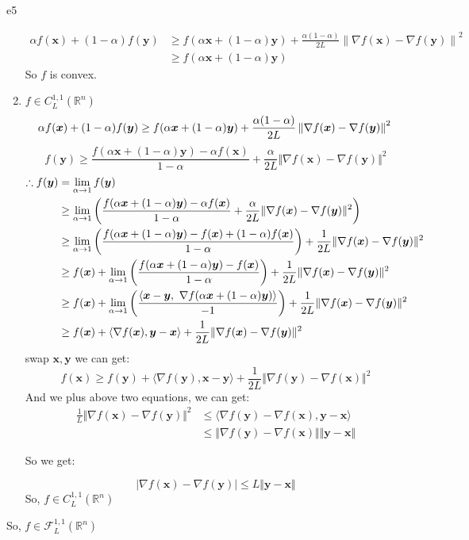 \documentclass{article}
\newcommand{\xB}{\bm{x}}
\newcommand{\yB}{\bm{y}}
\newcommand{\RBB}{\mathbb{R}}
\newcommand{\normgen}[1]{\left\| #1 \right\|}
\begin{document}
\begin{PROOF}{e5}
\begin{enumerate}
			\begin{align*} 
				\alpha f(\xB) + (1-\alpha) f(\yB) &\geq f( \alpha \xB + (1-\alpha) \yB) \nonumber + \frac{\alpha(1-\alpha)}{2L} \normgen{\nabla f(\xB) - \nabla f(\yB)}^2\\
				&\geq f( \alpha \xB + (1-\alpha) \yB) 
			\end{align*}
			So $f$ is convex.
		\item $f \in C_{L}^{1,1}(\RBB^n)$
			\begin{equation}
				\alpha f(\xB) + (1-\alpha) f(\yB) \geq f( \alpha \xB + (1-\alpha) \yB) \nonumber+ \frac{\alpha(1-\alpha)}{2L} \normgen{\nabla f(\xB) - \nabla f(\yB)}^2\\
			\end{equation}
			\begin{equation}
				f(\yB)\ge \frac{f(\alpha \xB + (1-\alpha) \yB)-\alpha f(\xB)}{1-\alpha}+\frac{\alpha}{2L} \Vert \nabla f(\xB) - \nabla f(\yB)\Vert ^2
			\end{equation}
			\begin{align}
				\therefore f(\yB) &= \lim_{\alpha\rightarrow 1}f(\yB)\\
				&\ge \lim_{\alpha\rightarrow 1} \left(\frac{f(\alpha \xB + (1-\alpha) \yB)-\alpha f(\xB)}{1-\alpha}+\frac{\alpha}{2L} \Vert \nabla f(\xB) - \nabla f(\yB)\Vert ^2\right)\\
				&\ge \lim_{\alpha\rightarrow 1} \left(\frac{f(\alpha \xB + (1-\alpha) \yB)-f(\xB) + (1-\alpha) f(\xB)}{1-\alpha}\right)+\frac{1}{2L} \Vert \nabla f(\xB) - \nabla f(\yB)\Vert ^2\\
				&\ge f(\xB)+\lim_{\alpha\rightarrow 1} \left(\frac{f(\alpha \xB + (1-\alpha) \yB)-f(\xB)}{1-\alpha}\right)+\frac{1}{2L}\Vert \nabla f(\xB)-\nabla f(\yB)\Vert ^2\\
				&\ge f(\xB)+\lim_{\alpha\rightarrow 1} \left(\frac{\innerproduct{\xB-\yB}{\nabla f(\alpha \xB + (1-\alpha) \yB)}}{-1}\right)+\frac{1}{2L}\Vert \nabla f(\xB)-\nabla f(\yB)\Vert ^2\\
				&\ge f(\xB)+\langle\nabla f(\xB),\yB-\xB\rangle+\frac{1}{2L}\Vert \nabla f(\xB)-\nabla f(\yB)\Vert ^2
			\end{align}
			swap $\xB,\yB$ we can get:
			\begin{equation}
				f(\xB)\ge f(\yB)+\langle\nabla f(\yB),\xB-\yB\rangle+\frac{1}{2L}\Vert \nabla f(\yB)-\nabla f(\xB)\Vert ^2
			\end{equation}
			And we plus above two equations, we can get:
			\begin{align}
				\frac{1}{L}\Vert \nabla f(\xB)-\nabla f(\yB)\Vert ^2&\le \langle\nabla f(\yB)-\nabla f(\xB),\yB-\xB\rangle\\
				&\le \Vert \nabla f(\yB)-\nabla f(\xB)\Vert \Vert \yB-\xB\Vert
			\end{align}

			So we get: 

			\[\vert \nabla f(\xB)-\nabla f(\yB)\vert \le L\Vert \yB-\xB \Vert\]
			So, $f\in C_{L}^{1,1}(\mathbb{R}^n)$
	\end{enumerate}
	So, $f\in \mathcal{F}_{L}^{1,1}(\mathbb{R}^n)$




\end{PROOF}
\end{document}
